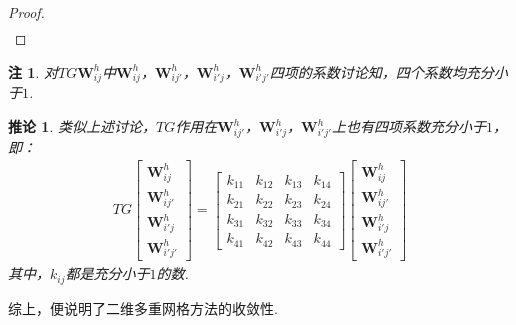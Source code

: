 \documentclass[a4paper,11.5pt,UTF8]{ctexart}
\newtheorem*{remark}{注}
\newtheorem{corollary}{推论}[section]
\begin{document}
\begin{large}
\begin{proof}
\begin{align*}
	\end{align*}
\end{proof}
\begin{remark}
	对$TG\mathbf{W}_{ij}^h$中$\mathbf{W}_{ij}^h$，$\mathbf{W}_{ij'}^h$，$\mathbf{W}_{i'j}^h$，$\mathbf{W}_{i'j'}^h$四项的系数讨论知，四个系数均充分小于$1$.
\end{remark}

\begin{corollary}
	类似上述讨论，$TG$作用在$\mathbf{W}_{ij'}^h$，$\mathbf{W}_{i'j}^h$，$\mathbf{W}_{i'j'}^h$上也有四项系数充分小于$1$，即：
	\begin{align*}
	TG\begin{bmatrix}
		\mathbf{W}_{ij}^h \\
		\mathbf{W}_{ij'}^h \\
		\mathbf{W}_{i'j}^h \\
		\mathbf{W}_{i'j'}^h
	\end{bmatrix}=\begin{bmatrix}
		k_{11} & k_{12} & k_{13} & k_{14} \\
		k_{21} & k_{22} & k_{23} & k_{24} \\
		k_{31} & k_{32} & k_{33} & k_{34} \\
		k_{41} & k_{42} & k_{43} & k_{44} 
	\end{bmatrix} \begin{bmatrix}
		\mathbf{W}_{ij}^h \\
		\mathbf{W}_{ij'}^h \\
		\mathbf{W}_{i'j}^h \\
		\mathbf{W}_{i'j'}^h
	\end{bmatrix}
	\end{align*}
	其中，$k_{ij}$都是充分小于$1$的数.
\end{corollary}
综上，便说明了二维多重网格方法的收敛性.





\end{large}
\end{document}
